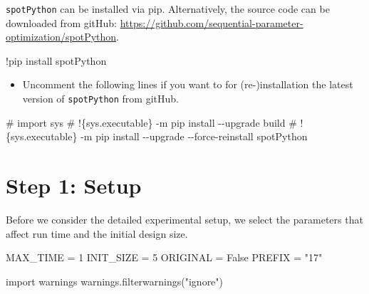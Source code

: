 \documentclass[
  letterpaper,
  DIV=11,
  numbers=noendperiod]{scrreprt}
\newenvironment{Shaded}{\begin{snugshade}}{\end{snugshade}}
\newcommand{\CommentTok}[1]{\textcolor[rgb]{0.37,0.37,0.37}{#1}}
\newcommand{\DecValTok}[1]{\textcolor[rgb]{0.68,0.00,0.00}{#1}}
\newcommand{\ImportTok}[1]{\textcolor[rgb]{0.00,0.46,0.62}{#1}}
\newcommand{\NormalTok}[1]{\textcolor[rgb]{0.00,0.23,0.31}{#1}}
\newcommand{\OperatorTok}[1]{\textcolor[rgb]{0.37,0.37,0.37}{#1}}
\newcommand{\StringTok}[1]{\textcolor[rgb]{0.13,0.47,0.30}{#1}}
\newcommand{\VariableTok}[1]{\textcolor[rgb]{0.07,0.07,0.07}{#1}}
\providecommand{\tightlist}{%
  \setlength{\itemsep}{0pt}\setlength{\parskip}{0pt}}\usepackage{longtable,booktabs,array}
\begin{document}
\texttt{spotPython} can be installed via pip. Alternatively, the source
code can be downloaded from gitHub:
\url{https://github.com/sequential-parameter-optimization/spotPython}.

\begin{Shaded}
\begin{Highlighting}[]
\NormalTok{!pip install spotPython}
\end{Highlighting}
\end{Shaded}

\begin{itemize}
\tightlist
\item
  Uncomment the following lines if you want to for (re-)installation the
  latest version of \texttt{spotPython} from gitHub.
\end{itemize}

\begin{Shaded}
\begin{Highlighting}[]
\CommentTok{\# import sys}
\CommentTok{\# !\{sys.executable\} {-}m pip install {-}{-}upgrade build}
\CommentTok{\# !\{sys.executable\} {-}m pip install {-}{-}upgrade {-}{-}force{-}reinstall spotPython}
\end{Highlighting}
\end{Shaded}

\hypertarget{sec-setup-17}{%
\section{Step 1: Setup}\label{sec-setup-17}}

Before we consider the detailed experimental setup, we select the
parameters that affect run time and the initial design size.

\begin{Shaded}
\begin{Highlighting}[]
\NormalTok{MAX\_TIME }\OperatorTok{=} \DecValTok{1}
\NormalTok{INIT\_SIZE }\OperatorTok{=} \DecValTok{5}
\NormalTok{ORIGINAL }\OperatorTok{=} \VariableTok{False}
\NormalTok{PREFIX }\OperatorTok{=} \StringTok{"17"}
\end{Highlighting}
\end{Shaded}

\begin{Shaded}
\begin{Highlighting}[]
\ImportTok{import}\NormalTok{ warnings}
\NormalTok{warnings.filterwarnings(}\StringTok{"ignore"}\NormalTok{)}
\end{Highlighting}
\end{Shaded}
\end{document}
